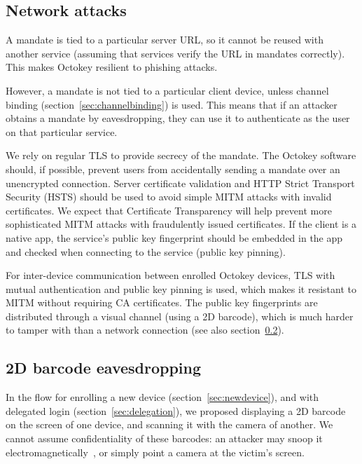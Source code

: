 \subsection{Network attacks}\label{sec:netattack}

A mandate is tied to a particular server URL, so it cannot be reused with another service (assuming
that services verify the URL in mandates correctly). This makes Octokey resilient to phishing
attacks.

However, a mandate is not tied to a particular client device, unless channel binding
(section~\ref{sec:channelbinding}) is used. This means that if an attacker obtains a mandate by
eavesdropping, they can use it to authenticate as the user on that particular service.

We rely on regular TLS to provide secrecy of the mandate. The Octokey software should, if possible,
prevent users from accidentally sending a mandate over an unencrypted connection. Server certificate
validation and HTTP Strict Transport Security (HSTS) should be used to avoid simple MITM attacks
with invalid certificates. We expect that Certificate Transparency will help prevent more
sophisticated MITM attacks with fraudulently issued certificates. If the client is a native app, the
service's public key fingerprint should be embedded in the app and checked when connecting to the
service (public key pinning).

For inter-device communication between enrolled Octokey devices, TLS with mutual authentication and
public key pinning is used, which makes it resistant to MITM without requiring CA certificates. The
public key fingerprints are distributed through a visual channel (using a 2D barcode), which is much
harder to tamper with than a network connection (see also section~\ref{sec:barcode-intercept}).

\subsection{2D barcode eavesdropping}\label{sec:barcode-intercept}

In the flow for enrolling a new device (section~\ref{sec:newdevice}), and with delegated login
(section~\ref{sec:delegation}), we proposed displaying a 2D barcode on the screen of one device, and
scanning it with the camera of another. We cannot assume confidentiality of these barcodes: an
attacker may snoop it electromagnetically~\cite{Kuhn05}, or simply point a camera at the victim's
screen.


